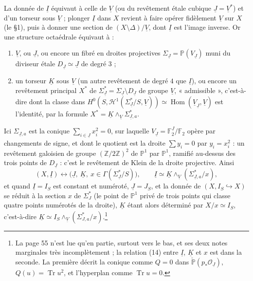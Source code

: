\documentclass[11pt,a4paper]{article}
\begin{document}
La donnée de $\underline{I}$ équivaut à celle de $\underline{V}$ (ou du
revêtement étale cubique $\underline{J} = \underline{V}^{*}$) et d'un torseur
sous $\underline{V}$ ; plonger $\underline{I}$ dans $X$ revient à faire opérer
fidèlement $\underline{V}$ sur $X$ (le §1), puis à donner une section de
$(X \setminus \Delta)/\underline{V}$, dont $\underline{I}$ est l'image inverse.
Or une structure octaédrale équivaut à :
\begin{enumerate}
\item[a)] $\underline{V}$, ou $\underline{J}$, ou encore un fibré en droites
projectives $\Sigma_{\underline{J}} = \mathbb{P}(V_{\underline{J}})$ muni du
diviseur étale $D_{\underline{J}} \simeq \underline{J}$ de degré $3$ ;
\item[b)] un torseur $\underline{K}$ sous $\underline{V}$ (un autre
revêtement de degré $4$ que $\underline{I}$), ou encore un revêtement
principal $X^{*}$ de $\Sigma_{\underline{J}}^{*} = \Sigma_{\underline{J}}
\setminus D_{\underline{J}}$ de groupe $\underline{V}$, « admissible »,
c'est-à-dire dont la classe dans $H^0(S, \mathcal{H}^1(\Sigma^{*}_{\underline{J}}
/ S, \underline{V})) \simeq \operatorname{Hom}(\underline{V}_{\underline{J}},
\underline{V})$ est l'identité, par la formule $X^{*} = \underline{K}
\wedge_{\underline{V}} \Sigma^{*}_{\underline{J}, a}$.
\end{enumerate}
Ici $\Sigma_{\underline{J}, a}$ est la conique $\sum_{i \in \underline{J}}
x_i^2 = 0$, sur laquelle $V_{\underline{J}} = \mathbb{F}_2^{\underline{J}} /
\mathbb{F}_2$ opère par changements de signe, et dont le quotient est la droite
$\sum y_i = 0$ par $y_i = x_i^2$ : un revêtement galoisien de groupe
$(\mathbb{Z}/2\mathbb{Z})^2$ de $\mathbb{P}^1$ par $\mathbb{P}^1$, ramifié au-dessus
des trois points de $D_{\underline{J}}$ : c'est le revêtement de Klein de la droite
projective. Ainsi
\[
(X, \underline{I}) \longleftrightarrow \bigl(\underline{J},\ \underline{K},\
x \in \Gamma(\Sigma^{*}_{\underline{J}} / S)\bigr), \qquad \underline{I} \simeq
\underline{K} \wedge_{\underline{V}} (\Sigma^{*}_{\underline{J}, a} / x),
\]
et quand $\underline{I} = I_S$ est constant et numéroté, $\underline{J} = J_S$,
et la donnée de $(X, I_S \hookrightarrow X)$ se réduit à la section $x$ de
$\Sigma^{*}_J$ (le point de $\mathbb{P}^1$ privé de trois points qui classe
quatre points numérotés de la droite), $\underline{K}$ étant alors déterminé
par $X/x \simeq I_S$, c'est-à-dire $\underline{K} \simeq I_S \wedge_{\underline{V}}
(\Sigma^{*}_{J,a}/x)$.\footnote{La page 55 n'est lue qu'en partie, surtout vers
le bas, et ses deux notes marginales très incomplètement ; la relation (14)
entre $\underline{I}$, $\underline{K}$ et $x$ est dans la seconde. La première
décrit la conique comme $Q = 0$ dans $\check{\mathbb{P}}(p_*
\mathcal{O}_{\underline{J}})$, $Q(u) = \operatorname{Tr} u^2$, et l'hyperplan
comme $\operatorname{Tr} u = 0$.}
\end{document}
